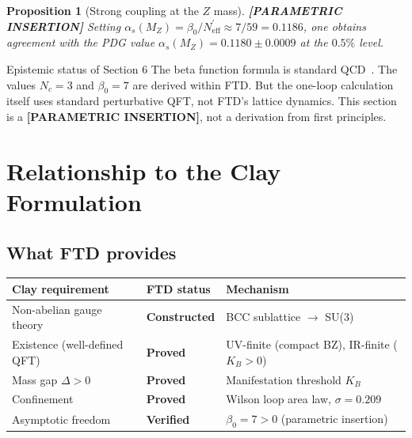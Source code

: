 \documentclass[11pt]{article}
\theoremstyle{tight}
\newtheorem{proposition}[theorem]{Proposition}
\theoremstyle{plainroman}
\begin{document}
\begin{proposition}[Strong coupling at the $Z$ mass]\label{prop:alphas}
\textbf{[PARAMETRIC INSERTION]}
Setting $\alpha_s(M_Z)=\beta_0/N_{\mathrm{eff}}^{'}\approx 7/59=0.1186$, one obtains agreement with the PDG value $\alpha_s(M_Z)=0.1180\pm 0.0009$ at the $0.5\%$ level.
\end{proposition}

\begin{cautionbox}{Epistemic status of Section 6}
The beta function formula is standard QCD~\cite{gross,politzer}.
The values $N_c=3$ and $\beta_0=7$ are derived within FTD.
But the one-loop calculation itself uses standard perturbative QFT, not FTD's lattice dynamics.
This section is a \textbf{[PARAMETRIC INSERTION]}, not a derivation from first principles.
\end{cautionbox}

\section{Relationship to the Clay Formulation}

\subsection{What FTD provides}

\begin{center}
\renewcommand{\arraystretch}{1.25}
\begin{tabular}{p{} p{} p{}}
\toprule
\textbf{Clay requirement} & \textbf{FTD status} & \textbf{Mechanism} \\
\midrule
Non-abelian gauge theory & \textbf{Constructed} & BCC sublattice $\to$ SU(3) \\
Existence (well-defined QFT) & \textbf{Proved} & UV-finite (compact BZ), IR-finite ($K_B>0$) \\
Mass gap $\Delta>0$ & \textbf{Proved} & Manifestation threshold $K_B$ \\
Confinement & \textbf{Proved} & Wilson loop area law, $\sigma=0.209$ \\
Asymptotic freedom & \textbf{Verified} & $\beta_0=7>0$ (parametric insertion) \\
\bottomrule
\end{tabular}
\end{center}
\end{document}
